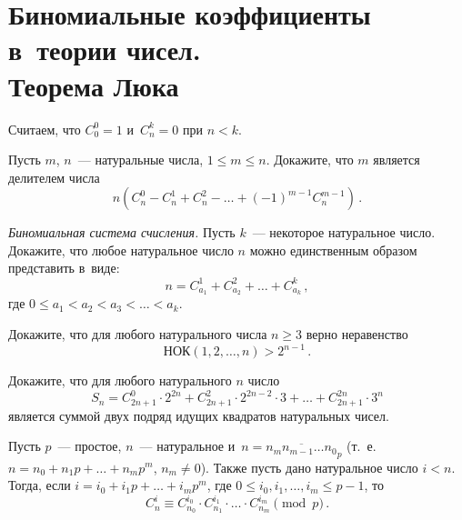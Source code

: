 
\setcounter{footnote}{0}


\section*{Биномиальные коэффициенты в~теории чисел.\\Теорема Люка}


\begingroup
    \def\ov{\overline}

Считаем, что $C_0^0 = 1$ и~$C_n^k = 0$ при $n < k$.

\begin{problems}

\item
Пусть $m$, $n$~--- натуральные числа, $1 \leq m \leq n$.
Докажите, что $m$ является делителем числа
\[
    n (C_n^0 - C_n^1 + C_n^2 - \ldots + (-1)^{m-1}C_n^{m-1})
\, . \]

\item\emph{Биномиальная система счисления.}
Пусть $k$~--- некоторое натуральное число.
Докажите, что любое натуральное число $n$ можно единственным образом
представить в~виде:
\[
    n = C_{a_1}^1 + C_{a_2}^2 + \ldots + C_{a_k}^k
\, , \]
где $0 \leq a_1 < a_2 < a_3 < \ldots < a_k$.

\item
Докажите, что для любого натурального числа $n \geq 3$ верно неравенство
\[
    \text{НОК}(1, 2, \ldots, n) > 2^{n-1}
\, . \]

\item
Докажите, что для любого натурального $n$ число
\[
    S_n
=
    C_{2n+1}^0 \cdot 2^{2n}
    +
    C_{2n+1}^2 \cdot 2^{2n-2} \cdot 3
    + \ldots +
    C_{2n+1}^{2n}\cdot 3^n
\]
является суммой двух подряд идущих квадратов натуральных чисел.

\end{problems}

Пусть $p$~--- простое, $n$~--- натуральное
и~$n = \ov{n_m n_{m-1}  \ldots n_0}_p$
(т.~е. $n = n_0 + n_1 p + \ldots + n_m p^m$, $n_m \neq 0$).
Также пусть дано натуральное число $i < n$.
Тогда, если $i = i_0 + i_1 p + \ldots + i_m p^m$, где
$0 \leq i_0, i_1, \ldots, i_m \leq p-1$,
то~\[
    C_n^i
\equiv
    C_{n_0}^{i_0} \cdot C_{n_1}^{i_1} \cdot \ldots \cdot C_{n_m}^{i_m}
\pmod{p}
\, . \]

